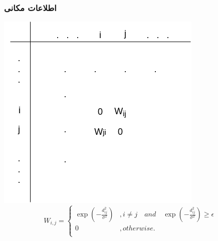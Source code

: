 \documentclass{beamer}
\begin{document}
\begin{frame}
  \frametitle{اطلاعات مکانی}
  \includegraphics[height=.5\textheight]{img/matrix.png}
  \begin{equation}
    W_{i,j} = \left\{
      \begin{array}{ll}
        \exp(-\frac{d^{2}_{ij}}{\sigma^{2}}) & , i \neq j \quad and \quad \exp(-\frac{d^{2}_{ij}}{\sigma^{2}}) \geq \epsilon \\
        0 & , otherwise. \\
      \end{array}\right.
    \label{eq:distance}
  \end{equation}
\end{frame}
\end{document}
